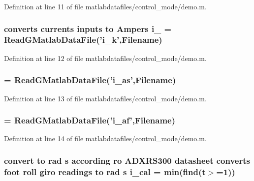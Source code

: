 Definition at line 11 of file matlabdatafiles/control\_\-mode/demo.m.
\subsubsection[{i\_\-1}]{\setlength{\rightskip}{0pt plus 5cm}converts currents inputs to Ampers {\bf i\_} = ReadGMatlabDataFile('{\bf i\_\-k}',{\bf Filename})}\label{matlabdatafiles_2control__mode_2demo_8m_af9e7d4a08f65a50f2fca548e896e70c5}


Definition at line 12 of file matlabdatafiles/control\_\-mode/demo.m.
\subsubsection[{i\_\-2}]{ = ReadGMatlabDataFile('{\bf i\_\-as}',{\bf Filename})}\label{matlabdatafiles_2control__mode_2demo_8m_a0dc010b9e612b60013fbb0684b755b6d}


Definition at line 13 of file matlabdatafiles/control\_\-mode/demo.m.
\subsubsection[{i\_\-3}]{ = ReadGMatlabDataFile('{\bf i\_\-af}',{\bf Filename})}\label{matlabdatafiles_2control__mode_2demo_8m_a2c17b45b1a3f3948d6db6cb139a8ef94}


Definition at line 14 of file matlabdatafiles/control\_\-mode/demo.m.
\subsubsection[{i\_\-cal}]{\setlength{\rightskip}{0pt plus 5cm}convert to rad s according ro ADXRS300 datasheet converts foot roll giro readings to rad s {\bf i\_\-cal} = min(find({\bf t}$>$=1))}\label{matlabdatafiles_2control__mode_2demo_8m_abda9dfcf167320c88212f7110829e3bc}


